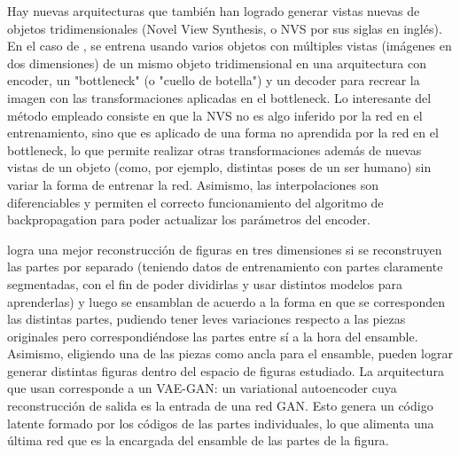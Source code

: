 \documentclass[spanish]{article}
\begin{document}
Hay nuevas arquitecturas \cite{Olszewski2019} que
también han logrado generar vistas nuevas de objetos tridimensionales
(Novel View Synthesis, o NVS por sus siglas en inglés). En el caso de
\cite{Olszewski2019}, se entrena usando varios objetos con múltiples
vistas (imágenes en dos dimensiones) de un mismo objeto tridimensional
en una arquitectura con encoder, un "bottleneck" (o "cuello de botella")
y un decoder para recrear la imagen con las transformaciones aplicadas
en el bottleneck. Lo interesante del método empleado consiste en que la
NVS no es algo inferido por la red en el entrenamiento, sino que es
aplicado de una forma no aprendida por la red en el bottleneck, lo que
permite realizar otras transformaciones además de nuevas vistas de un
objeto (como, por ejemplo, distintas poses de un ser humano) sin variar
la forma de entrenar la red. Asimismo, las interpolaciones son
diferenciables y permiten el correcto funcionamiento del algoritmo de
backpropagation para poder actualizar los parámetros del encoder.


\cite{Li2019} logra una mejor reconstrucción de figuras en tres dimensiones
si se reconstruyen las partes por separado (teniendo datos de entrenamiento
con partes claramente segmentadas, con el fin de poder dividirlas y usar
distintos modelos para aprenderlas) y luego se ensamblan de acuerdo a la
forma en que se corresponden las distintas partes, pudiendo tener leves
variaciones respecto a las piezas originales pero correspondiéndose las
partes entre sí a la hora del ensamble. Asimismo, eligiendo una de las
piezas como ancla para el ensamble, pueden lograr generar distintas
figuras dentro del espacio de figuras estudiado. La arquitectura que usan
corresponde a un VAE-GAN: un variational autoencoder cuya reconstrucción
de salida es la entrada de una red GAN. Esto genera un código latente
formado por los códigos de las partes individuales, lo que alimenta una
última red que es la encargada del ensamble de las partes de la figura.

\end{document}
